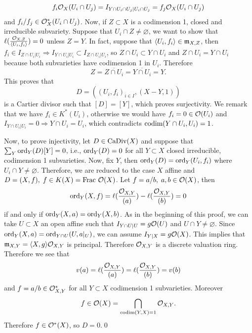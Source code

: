 \begin{equation}
    f_i\mathcal{O}_X(U_i\cap U_j )=I_{Y\cap U_i\cap U_j|U_i\cap U_j} = f_j\mathcal{O}_X(U_i\cap U_j)
\end{equation}
and $f_i/f_j\in\mathcal{O}_X^*(U_i\cap U_j)$. Now, if $Z\subset X$ is a codimension 1, closed and irreducible subvariety. 
Suppose that $U_i\cap Z\neq\varnothing$, we want to show that
$\ell(\tfrac{\mathcal{O}_{X,Z}}{\langle U_i,f_i\rangle})=0$ unless $Z=Y$. In fact, suppose that $\langle U_i, f_i\rangle\in\mathfrak{m}_{X,Z}$, then 
$f_i\in I_{Z\cap U_i|U_i}\Rightarrow I_{Y\cap U_i|U_i}\subset I_{Z\cap U_i|U_i}$, so 
$Z\cap U_i \subset Y\cap U_i$ and $Z\cap U_i = Y\cap U_i$ because both subvarieties have codimension 1 in $U_i$. Therefore 
\begin{equation}
    Z = \overline{Z\cap U_i} = \overline{Y\cap U_i} = Y.
\end{equation}
This proves that 
\begin{equation}
    D = ((U_i,f_i)_{i\in I},(X-Y,1))
\end{equation}
is a Cartier divisor such that $[D]=[Y]$, which proves surjectivity. We remark that we have $f_i\in K^*(U_i)$, otherwise 
we would have $f_i=0\in\mathcal{O}(U_i)$ and $I_{Y\cap U_i|U_i}=0\Rightarrow Y\cap U_i = U_i$, which contradicts 
$\text{codim}(Y\cap U_i, U_i)=1$.\par 

Now, to prove injectivity, let $D\in\text{CaDiv}(X)$ and suppose that $\sum_Y\text{ord}_Y(D)[Y]= 0$, i.e., 
$\text{ord}_Y(D) = 0$ for all $Y\subset X$ closed irreducible, codimension 1 subvarieties. Now, 
fix $Y$, then $\text{ord}_Y(D) = \text{ord}_Y(U_i, f_i)$ where $U_i\cap Y\neq\varnothing$. Therefore, we are reduced to the case 
$X$ affine and $D=(X,f),\;f\in K(X)=\text{Frac }\mathcal{O}(X)$. Let $f=a/b,\;a,b\in \mathcal{O}(X)$, then 
\begin{equation}
    \text{ord}_Y(X,f) = \ell(\frac{\mathcal{O}_{X,Y}}{(a)}) -\ell(\frac{\mathcal{O}_{X,Y}}{(b)}) = 0
\end{equation} 
if and only if $\text{ord}_Y(X,a) = \text{ord}_Y(X,b)$. As in the beginning of this proof, we can take $U\subset X$ an open affine 
such that $I_{Y\cap U|U} = g\mathcal{O}(U)$ and $U\cap Y\neq\varnothing$. Since $\text{ord}_Y(X,a) = \text{ord}_{Y\cap U}(U,a|_U)$, we 
can assume $I_{Y|X} = g\mathcal{O}(X)$. This implies that $\mathfrak{m}_{X,Y} = \langle X,g\rangle\mathcal{O}_{X,Y}$ is principal. 
Therefore $\mathcal{O}_{X,Y}$ is a discrete valuation ring. Therefore we see that 
\begin{equation}
    v(a) = \ell(\frac{\mathcal{O}_{X,Y}}{(a)}) =\ell(\frac{\mathcal{O}_{X,Y}}{(b)}) = v(b)
\end{equation}
and $f=a/b\in \mathcal{O}_{X,Y}^*$ for all $Y\subset X$ codimension 1 subvarieties. Moreover 
\begin{equation}
    f\in \mathcal{O}(X) = \bigcap_{\text{codim}(Y,X)=1}\mathcal{O}_{X,Y}.
\end{equation}
Therefore $f\in\mathcal{O}^*(X)$, so $D=0$.\qed


